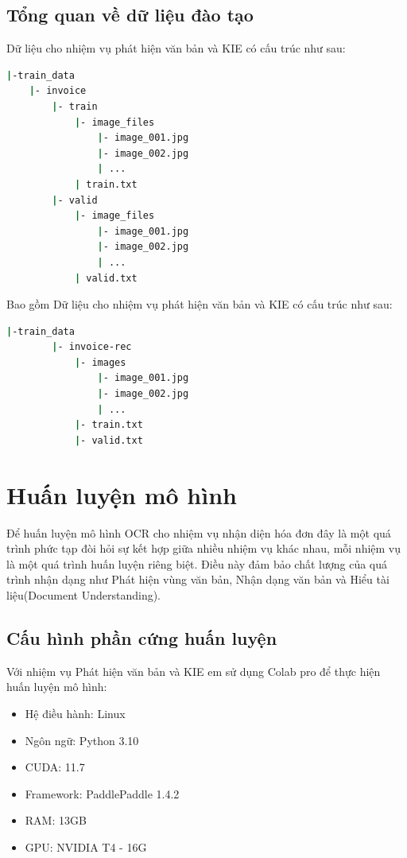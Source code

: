 \subsection{Tổng quan về dữ liệu đào tạo}
Dữ liệu cho nhiệm vụ phát hiện văn bản và KIE có cấu trúc như sau:
\begin{lstlisting}[language=bash]
|-train_data
    |- invoice
        |- train
            |- image_files
                |- image_001.jpg
                |- image_002.jpg
                | ...
            | train.txt
        |- valid
            |- image_files
                |- image_001.jpg
                |- image_002.jpg
                | ...
            | valid.txt  
\end{lstlisting}

Bao gồm 
Dữ liệu cho nhiệm vụ phát hiện văn bản và KIE có cấu trúc như sau:
\begin{lstlisting}[language=bash]
    |-train_data
        |- invoice-rec
            |- images
                |- image_001.jpg
                |- image_002.jpg
                | ...
            |- train.txt
            |- valid.txt
    \end{lstlisting}

\section{Huấn luyện mô hình}
Để huấn luyện mô hình OCR cho nhiệm vụ nhận diện hóa đơn đây là một quá trình phức tạp đòi hỏi sự kết hợp giữa nhiều nhiệm vụ khác nhau, mỗi nhiệm vụ là một quá trình huấn luyện riêng biệt. Điều này đảm bảo chất lượng của quá trình nhận dạng như Phát hiện vùng văn bản, Nhận dạng văn bản và Hiểu tài liệu(Document Understanding).

\subsection{Cấu hình phần cứng huấn luyện}
Với nhiệm vụ Phát hiện văn bản và KIE em sử dụng Colab pro để thực hiện huấn luyện mô hình:
\begin{itemize}
    \item Hệ điều hành: Linux
    \item Ngôn ngữ: Python 3.10
    \item CUDA: 11.7
    \item Framework: PaddlePaddle 1.4.2
    \item RAM: 13GB
    \item GPU: NVIDIA T4 - 16G
\end{itemize}

